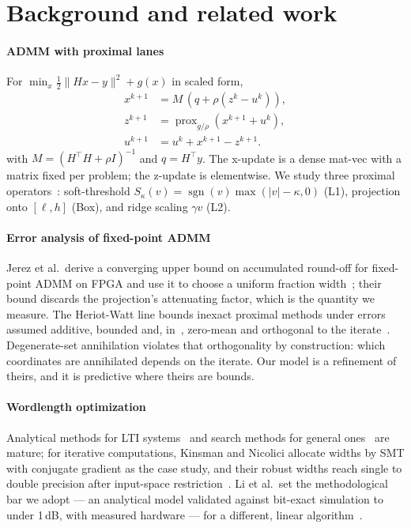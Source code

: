 \documentclass[conference]{IEEEtran}
\begin{document}
\section{Background and related work}
\label{sec:related}

\paragraph{ADMM with proximal lanes} For
$\min_x \tfrac12\lVert Hx-y\rVert^2+g(x)$ in scaled form,
\begin{align}
x^{k+1} &= M\,(q+\rho(z^k-u^k)), \nonumber\\
z^{k+1} &= \operatorname{prox}_{g/\rho}(x^{k+1}+u^k), \label{eq:admm}\\
u^{k+1} &= u^k+x^{k+1}-z^{k+1}. \nonumber
\end{align}
with $M=(H^{\top}H+\rho I)^{-1}$ and $q=H^{\top}y$. The x-update is a dense
mat-vec with a matrix fixed per problem; the z-update is elementwise. We study three proximal operators~\cite{parikh2014prox}:
soft-threshold $S_\kappa(v)=\operatorname{sgn}(v)\max(|v|-\kappa,0)$ (L1),
projection onto $[\ell,h]$ (Box), and ridge scaling $\gamma v$ (L2).

\paragraph{Error analysis of fixed-point ADMM} Jerez et al.\ derive a converging
upper bound on accumulated round-off for fixed-point ADMM on FPGA and use it to
choose a uniform fraction width~\cite{jerez2014mpc}; their bound discards the
projection's attenuating factor, which is the quantity we measure. The
Heriot-Watt line bounds inexact proximal methods under errors assumed additive,
bounded and, in~\cite{hamadouche2022sharper}, zero-mean and orthogonal to the
iterate~\cite{hamadouche2022inexact,hamadouche2022sharper}. Degenerate-set
annihilation violates that orthogonality by construction: which coordinates are
annihilated depends on the iterate. Our model is a refinement of theirs, and it
is predictive where theirs are bounds.

\paragraph{Wordlength optimization} Analytical methods for LTI
systems~\cite{constantinides2003wordlength} and search methods for general
ones~\cite{ha2020scalable,ha2023accuracy} are mature; for iterative
computations, Kinsman and Nicolici allocate widths by SMT with conjugate
gradient as the case study, and their robust widths reach single to double
precision after input-space restriction~\cite{kinsman2011iterative}. Li et
al.\ set the methodological bar we adopt --- an analytical model validated
against bit-exact simulation to under 1\,dB, with measured hardware ---
for a different, linear algorithm~\cite{li2023fam}.
\end{document}
